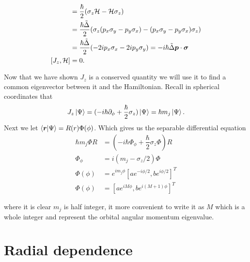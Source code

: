 \begin{align*}
  [S_z,\Ham] &= \dfrac{\hbar}{2}(\sigma_z\Ham - \Ham\sigma_z) \\
  &= \dfrac{\hbar\tilde{\Delta}}{2}(\sigma_z(p_x\sigma_y - p_y\sigma_x) - (p_x\sigma_y - p_y\sigma_x)\sigma_z) \\
  &= \dfrac{\hbar\tilde{\Delta}}{2}(-2ip_x\sigma_x - 2ip_y\sigma_y) = -i\hbar\tilde{\Delta}\bm{p}\cdot\bm{\sigma} \\
  [J_z,\Ham] &= 0.
\end{align*}

Now that we have shown $J_z$ is a conserved quantity we will use it to find a common eigenvector between it and the Hamiltonian.
Recall in spherical coordinates that 
\begin{equation}
  J_z\ket{\Psi} = (-i\hbar\partial_{\phi} + \dfrac{\hbar}{2}\sigma_z)\ket{\Psi} =  \hbar m_j\ket{\Psi}.
\end{equation}
Next we let $\bra{\bm{r}}\ket{\Psi} = R(r)\Phi(\phi)$.
Which gives us the separable differential equation
\begin{align*}
  \hbar m_j \Phi R &= (-i\hbar\Phi_{\phi}+\dfrac{\hbar}{2}\sigma_z\Phi)R \\
  \Phi_{\phi} &= i(m_j-\sigma_z/2)\Phi \\
  \Phi(\phi) &= e^{im_j\phi} [ a e^{-i\phi/2}, b e^{i\phi/2} ]^T \\
  \Phi(\phi) &= [ a e^{iM\phi}, b e^{i(M+1)\phi} ]^T
\end{align*}

where it is clear $m_j$ is half integer, it more convenient to write it as $M$ which is a whole integer and represent the orbital angular momentum eigenvalue.

\section{Radial dependence}

